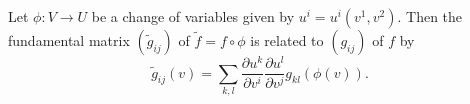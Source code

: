 Let $\phi: V \to U$ be a change of variables given by $u^i = u^i(v^1, v^2)$. Then the fundamental matrix $(\tilde{g}_{ij})$ of $\tilde{f} = f \circ \phi$ is related to $(g_{ij})$ of $f$ by
$$\tilde{g}_{ij}(v) = \sum_{k,l} \frac{\partial u^k}{\partial v^i} \frac{\partial u^l}{\partial v^j} g_{kl}(\phi(v)).$$